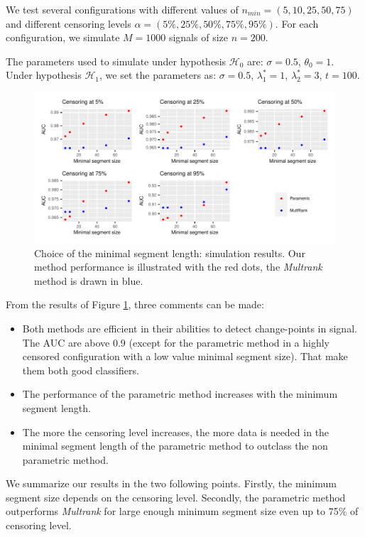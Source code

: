 We test several configurations with different values of $n_{min} = (5,10,25,50,75)$ and different censoring levels $\alpha = (5\%,25\%,50\%,75\%,95\%)$. For each configuration, we simulate $M = 1000$ signals of size $n = 200$. 

The parameters used to simulate under hypothesis $\mathcal{H}_0$ are: $\sigma = 0.5$, $\theta_0 = 1$. Under hypothesis $\mathcal{H}_1$, we set the parameters as: $\sigma = 0.5$, $\lambda^*_1 = 1$, $\lambda^*_2 = 3$, $t = 100$. 


\begin{figure}[ht]
\centering
\includegraphics{figs/Chap4/sim_minseg.pdf}
\caption{Choice of the minimal segment length: simulation results. Our method performance is illustrated with the red dots, the \textit{Multrank} method is drawn in blue.}
\label{fig:sim_minseg}
\end{figure}

From the results of Figure \ref{fig:sim_minseg}, three comments can be made:  
\begin{itemize}
\item Both methods are efficient in their abilities to detect change-points in signal. The AUC are above 0.9 (except for the parametric method in a highly censored configuration with a low value minimal segment size). That make them both good classifiers. 
\item The performance of the parametric method increases with the minimum segment length. 
\item The more the censoring level increases, the more data is needed in the minimal segment length of the parametric method to outclass the non parametric method. 
\end{itemize}

We summarize our results in the two following points. Firstly, the minimum segment size depends on the censoring level. Secondly, the parametric method outperforms \textit{Multrank} for large enough minimum segment size even up to 75\% of censoring level.

